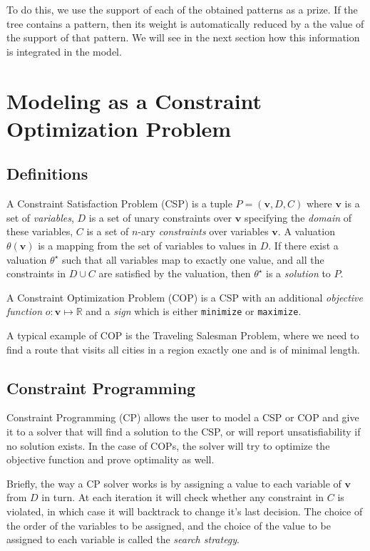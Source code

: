 \documentclass[letterpaper]{article} %
\begin{document}
To do this, we use the support of each of the obtained patterns as a prize. If 
the tree contains a pattern, then its weight is automatically reduced by a the 
value of the support of that pattern. We will see in the next section how this 
information is integrated in the model.







\section{Modeling as a Constraint Optimization Problem \label{SEC:CP}}

\subsection{Definitions}
A Constraint Satisfaction Problem (CSP) is a tuple $P = (\boldsymbol{v},D,C)$ 
where $\boldsymbol{v}$ is a 
set of \emph{variables}, $D$ is a set of unary constraints over 
$\boldsymbol{v}$ specifying 
the \emph{domain} of these variables, $C$ is a set of $n$-ary 
\emph{constraints} over variables $\boldsymbol{v}$.
A valuation $\theta(\boldsymbol{v})$ is a mapping from the set of variables to 
values in $D$. If there exist a valuation $\theta^\star$ such that all 
variables map 
to exactly one value, and all the constraints in $D\cup C$ are satisfied by the 
valuation, then $\theta^\star$ is a \emph{solution} to $P$.

A Constraint Optimization Problem (COP) is a CSP with an additional 
\emph{objective function} $o : \boldsymbol{v} \mapsto \mathbb{R}$ and a 
\emph{sign} which is either \verb|minimize| or \verb|maximize|. 

A typical example of COP is the Traveling Salesman Problem, where we need to 
find a route that visits all cities in a region exactly one and is of minimal 
length.

\subsection{Constraint Programming}
Constraint Programming (CP) allows the user to model a CSP or COP and give it 
to a 
solver that will find a solution to the CSP, or will report unsatisfiability if 
no solution exists. In the case of COPs, the solver will try to optimize 
the objective function and prove optimality as well.

Briefly, the way a CP solver works is by assigning a value to each variable of 
$\boldsymbol{v}$ from $D$ in turn. At each iteration it will check whether any 
constraint in $C$ is violated, in which case it will backtrack to change it's 
last decision. The choice of the order of the variables to be assigned, and the 
choice of the value to be assigned to each variable is called the \emph{search 
strategy}.
\end{document}
